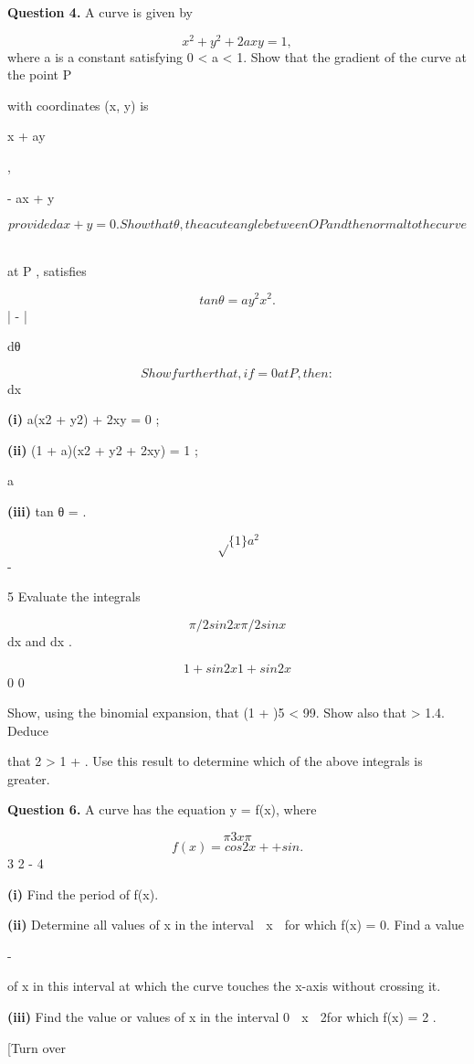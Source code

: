 \documentclass[12pt]{article}
\begin{document}
\begin{flushleft}
\bigskip\textbf{Question 4.} A curve is given by\par
\[x^2 + y^2 + 2axy = 1,\]
where a is a constant satisfying 0 < a < 1. Show that the gradient of the curve at the point P\par
with coordinates (x, y) is\par
x + ay\par
,\par
- ax + y\par
\[provided ax + y = 0. Show that θ, the acute angle between OP and the normal to the curve\]
\par
at P , satisfies\par
\[tan θ = a y^2 x^2 .\]
| - |\par
dθ\par
\[Show further that, if = 0 at P , then:\]
dx\par
\textbf{(i)} a(x2 + y2) + 2xy = 0 ;\par
\textbf{(ii)} (1 + a)(x2 + y2 + 2xy) = 1 ;\par
a\par
\textbf{(iii)} tan θ = .\par
\[\sqrt\{1\} a^2\]
-\par
5 Evaluate the integrals\par
\[\pi/2 sin 2x \pi/2 sin x\]
dx and dx .\par
\[1 + sin2 x 1 + sin2 x\]
0 0\par
Show, using the binomial expansion, that (1 +  )5 < 99. Show also that  > 1.4. Deduce\par
that 2 > 1 +  . Use this result to determine which of the above integrals is greater.\par
\bigskip\textbf{Question 6.} A curve has the equation y = f(x), where\par
\[\pi 3x \pi\]
\[f(x) = cos 2x + + sin .\]
3 2 - 4\par
\textbf{(i)} Find the period of f(x).\par
\textbf{(ii)} Determine all values of x in the interval \pi  x  \pi for which f(x) = 0. Find a value\par
-\par
of x in this interval at which the curve touches the x-axis without crossing it.\par
\textbf{(iii)} Find the value or values of x in the interval 0  x  2\pi for which f(x) = 2 .\par
[Turn over\par
 \par
   \par
\end{flushleft}
\end{document}

